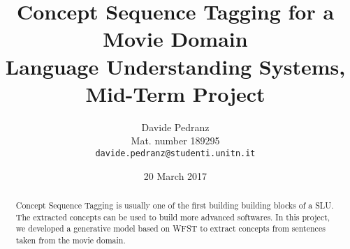 \documentclass[11pt,a4paper]{article}
\title{
  Concept Sequence Tagging for a Movie Domain \\
  Language Understanding Systems, Mid-Term Project
}
\author{Davide Pedranz \\
  Mat. number 189295 \\
  {\tt davide.pedranz@studenti.unitn.it}
}
\date{20 March 2017}
\begin{document}
\maketitle

\begin{abstract}
Concept Sequence Tagging is usually one of the first building building blocks of a \ac{SLU}.
The extracted concepts can be used to build more advanced softwares.
In this project, we developed a generative model based on \ac{WFST} to extract concepts from sentences taken from the movie domain.
\end{abstract}








\end{document}
